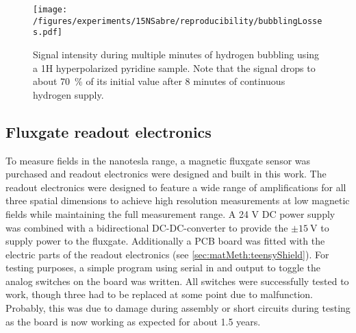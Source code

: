             \begin{figure}
                \centering
                \texttt{[image: /figures/experiments/15NSabre/reproducibility/bubblingLosses.pdf]}
                \caption[Bubbling fluid losses]{Signal intensity during multiple minutes of hydrogen bubbling using a 1H hyperpolarized pyridine sample. Note that the signal drops to about \SI{70}{\percent} of its initial value after 8 minutes of continuous hydrogen supply.}
                \label{fig:results:15N:shuttlingReproducibility}
            \end{figure}
    \subsection{Fluxgate readout electronics}
    To measure fields in the nanotesla range, a magnetic fluxgate sensor was purchased and readout electronics were designed and built in this work. The readout electronics were designed to feature a wide range of amplifications for all three spatial dimensions to achieve high resolution measurements at low magnetic fields while maintaining the full measurement range. A 24 V DC power supply was combined  with a bidirectional DC-DC-converter to provide the $\pm\SI{15}{\volt}$ to supply power to the fluxgate. Additionally a PCB board was fitted with the electric parts of the readout electronics (see \ref{sec:matMeth:teensyShield}). For testing purposes, a simple program using serial in and output to toggle the analog switches on the board was written. All switches were successfully tested to work, though three had to be replaced at some point due to malfunction. Probably, this was due to damage during assembly or short circuits during testing as the board is now working as expected for about 1.5 years.
